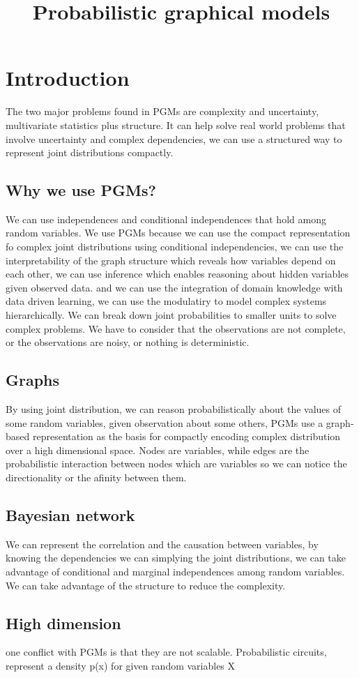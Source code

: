 \documentclass[11pt]{article}
\title{Probabilistic graphical models}
\author{}
\date{}
\begin{document}
\maketitle

\section{Introduction}
The two major problems found in PGMs are complexity and uncertainty, multivariate statistics plus structure. It can help solve real world problems that involve uncertainty and complex dependencies, we can use a structured way to represent joint distributions compactly.
\subsection{Why we use PGMs?}
We can use independences and conditional independences that hold among random variables. We use PGMs because we can use the compact representation fo complex joint distributions using conditional independencies, we can use the interpretability of the graph structure which reveals how variables depend on each other, we can use inference which enables reasoning about hidden variables given observed data. and we can use the integration of domain knowledge with data driven learning, we can use the modulatiry to model complex systems hierarchically. We can break down joint probabilities to smaller units to solve complex problems.
We have to consider that the observations are not complete, or the observations are noisy, or nothing is deterministic.
\subsection{Graphs}
By using joint distribution, we can reason probabilistically about the values of some random variables, given observation about some others, PGMs use a graph-based representation as the basis for compactly encoding complex distribution over a high dimensional space.
Nodes are variables, while edges are the probabilistic interaction between nodes which are variables so we can notice the directionality or the afinity between them. 

\subsection{Bayesian network}
We can represent the correlation and the causation between variables, by knowing the dependencies we can simplying the joint distributions, we can take advantage of conditional and marginal independences among random variables. We can take advantage of the structure to reduce the complexity.
\subsection{High dimension}
one conflict with PGMs is that they are not scalable.
Probabilistic circuits, represent a density p(x) for given random variables X
\end{document}
